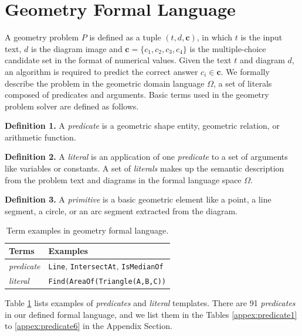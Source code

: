 \documentclass[11pt,a4paper]{article}
\begin{document}
\section{Geometry Formal Language} \label{sec:formal}

A geometry problem $P$ is defined as a tuple $(t,d,\mathbf{c})$, in which $t$ is the input text, $d$ is the diagram image and $\mathbf{c}=\{c_1, c_2, c_3, c_4\}$ is the multiple-choice candidate set in the format of numerical values. Given the text $t$ and diagram $d$, an algorithm is required to predict the correct answer $c_i \in \mathbf{c}$. We formally describe the problem in the geometric domain language $\Omega$, a set of literals composed of predicates and arguments. Basic terms used in the geometry problem solver are defined as follows.

\textbf{Definition 1.} A \textit{predicate} is a geometric shape entity, geometric relation, or arithmetic function.

\textbf{Definition 2.} A \textit{literal} is an application of one \textit{predicate} to a set of arguments like variables or constants. A set of \textit{literals} makes up the semantic description from the problem text and diagrams in the formal language space $\Omega$.

\textbf{Definition 3.} A \textit{primitive} is a basic geometric element like a point, a line segment, a circle, or an arc segment extracted from the diagram.

\begin{table}[ht]
\centering 
\footnotesize
\begin{tabular}{l|l}
	\hline
	\textbf{Terms} & \textbf{Examples} \\
	\hline
	\textit{predicate} & \footnotesize \texttt{Line}, \texttt{IntersectAt}, \texttt{IsMedianOf} \\
	\textit{literal} & \footnotesize \texttt{Find(AreaOf(Triangle(A,B,C))} \\
	\hline
\end{tabular}
\vspace{0mm}
\caption{Term examples in geometry formal language.}
\vspace{0mm}
\label{tab1:definition}
\end{table}

Table \ref{tab1:definition} lists examples of \textit{predicates} and \textit{literal} templates. There are 91 \textit{predicates} in our defined formal language, and we list them in the Tables \ref{appex:predicate1} to \ref{appex:predicate6} in the Appendix Section.
\end{document}
